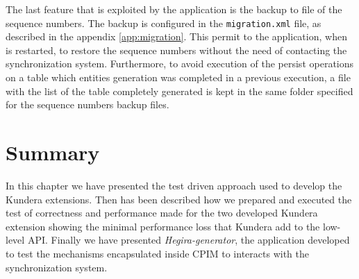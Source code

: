 \newparagraph The last feature that is exploited by the application is the backup to file of the sequence numbers. The backup is configured in the \texttt{migration.xml} file, as described in the appendix \ref{app:migration}.
This permit to the application, when is restarted, to restore the sequence numbers without the need of contacting the synchronization system. Furthermore, to avoid execution of the persist operations on a table which entities generation was completed in a previous execution, a file with the list of the table completely generated is kept in the same folder specified for the sequence numbers backup files.

\section{Summary}
In this chapter we have presented the test driven approach used to develop the Kundera extensions. Then has been described how we prepared and executed the test of correctness and performance made for the two developed Kundera extension showing the minimal performance loss that Kundera add to the low-level API.
Finally we have presented \textit{Hegira-generator}, the application developed to test the mechanisms encapsulated inside CPIM to interacts with the synchronization system.
